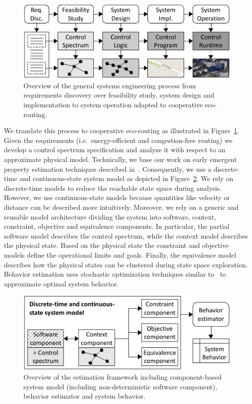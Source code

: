\documentclass[conference]{../cls/IEEEtran}
\begin{document}
\begin{figure}[b]
	\centering
	\includegraphics{../gfx/process.pdf}
	\caption{Overview of the general systems engineering process from requirements discovery over feasibility study, system design and implementation to system operation adapted to cooperative eco-routing.}
	\label{figure:process}
\end{figure}
We translate this process to cooperative eco-routing as illustrated in Figure~\ref{figure:process}.
Given the requirements (i.e.\ energy-efficient and congestion-free routing) we develop a control spectrum specification and analyze it with respect to an approximate physical model.
Technically, we base our work on early emergent property estimation techniques described in~\cite{Hackenberg2012}.
Consequently, we use a discrete-time and continuous-state system model as depicted in Figure~\ref{figure:framework}.
We rely on discrete-time models to reduce the reachable state space during analysis.
However, we use continuous-state models because quantities like velocity or distance can be described more intuitively.
Moreover, we rely on a generic and reusable model architecture dividing the system into software, context, constraint, objective and equivalence components.
In particular, the partial software model describes the control spectrum, while the context model describes the physical state.
Based on the physical state the constraint and objective models define the operational limits and goals.
Finally, the equivalence model describes how the physical states can be clustered during state space exploration.
Behavior estimation uses stochastic optimization techniques similar to~\cite{Pereira1991} to approximate optimal system behavior.

\begin{figure}[b]
	\centering
	\includegraphics{../gfx/framework.pdf}
	\caption{Overview of the estimation framework including component-based system model (including non-deterministic software component), behavior estimator and system behavior.}
	\label{figure:framework}
\end{figure}
\end{document}
